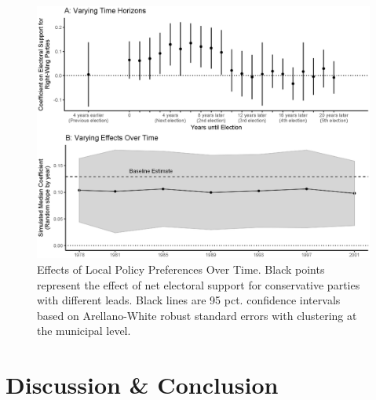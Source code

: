 \documentclass[a4paper,12pt]{article}
\begin{document}
\begin{figure}[h]
	\centering
	\includegraphics[scale = .6]{EffectsVsTime.eps}
	\caption{Effects of Local Policy Preferences Over Time. Black points represent the effect of net electoral support for conservative parties with different leads. Black lines are 95 pct. confidence intervals based on Arellano-White robust standard errors with clustering at the municipal level.}
	\label{fig:LongRun}
\end{figure}




\section*{Discussion \& Conclusion}



\onehalfspacing
%
%

\clearpage

\renewcommand{\thesubsection}{\Alph{subsection}}
\renewcommand{\thetable}{\Alph{subsection}\arabic{table}}
\renewcommand{\thefigure}{\Alph{subsection}\arabic{figure}}
\end{document}
